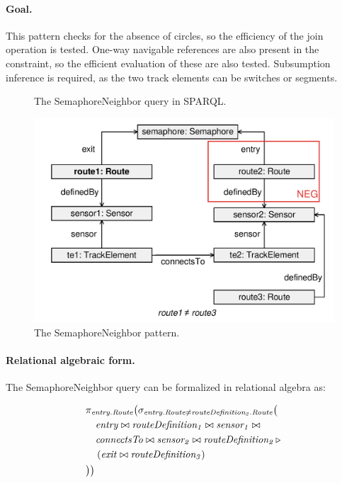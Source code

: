 \paragraph{Goal.} This pattern checks for the absence of circles, so the efficiency of the join operation is tested. One-way navigable references are also present in the constraint, so the efficient evaluation of these are also tested. Subsumption inference is required, as the two track elements can be switches or segments.

\begin{figure}[htb]
\centering
\begin{minipage}{0.6\textwidth}
  { \alignListing
    }
  \caption{The \textsf{SemaphoreNeighbor} query in SPARQL.}
  \label{lst:semaphoreneighbor-sparql}
\end{minipage}
\end{figure}

\begin{figure}[htb]
		\centering
		\includegraphics[scale=0.4]{figures/pattern-semaphoreneighbor}
		\caption{The \textsf{SemaphoreNeighbor} pattern.}
		\label{fig:pattern-semaphoreneighbor}
\end{figure}

\paragraph{Relational algebraic form.} The \textsf{SemaphoreNeighbor} query can be formalized in relational algebra as:

\begin{align*}
& \pi_{\mathit{entry.Route}} \big( \sigma_{\mathit{entry.Route} \neq \mathit{routeDefinition_2.Route}} \big( \\
& \quad \mathit{entry} \bowtie \mathit{routeDefinition_1} \bowtie \mathit{sensor_1} \bowtie \\
& \quad \mathit{connectsTo} \bowtie \mathit{sensor_2} \bowtie \mathit{routeDefinition_2} \, \triangleright \, \\
& \quad \left( \mathit{exit} \bowtie \mathit{routeDefinition_3} \right) \\
& \big) \big)
\end{align*}

